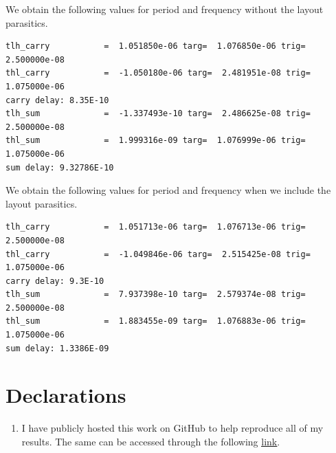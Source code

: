 \documentclass[12pt,a4paper]{article}
\begin{document}
\noindent We obtain the following values for period and frequency without the layout parasitics.
\begin{verbatim}
tlh_carry           =  1.051850e-06 targ=  1.076850e-06 trig=  2.500000e-08
thl_carry           =  -1.050180e-06 targ=  2.481951e-08 trig=  1.075000e-06
carry delay: 8.35E-10
tlh_sum             =  -1.337493e-10 targ=  2.486625e-08 trig=  2.500000e-08
thl_sum             =  1.999316e-09 targ=  1.076999e-06 trig=  1.075000e-06
sum delay: 9.32786E-10
\end{verbatim}
\noindent We obtain the following values for period and frequency when we include the layout parasitics.
\begin{verbatim}
tlh_carry           =  1.051713e-06 targ=  1.076713e-06 trig=  2.500000e-08
thl_carry           =  -1.049846e-06 targ=  2.515425e-08 trig=  1.075000e-06
carry delay: 9.3E-10
tlh_sum             =  7.937398e-10 targ=  2.579374e-08 trig=  2.500000e-08
thl_sum             =  1.883455e-09 targ=  1.076883e-06 trig=  1.075000e-06
sum delay: 1.3386E-09
\end{verbatim}

\section{Declarations}
\begin{enumerate}
    \item I have publicly hosted this work on GitHub to help reproduce all of my results. The same can be accessed through the following \href{https://github.com/iamkarthikbk/ee5311-2025}{\underline{link}}.
\end{enumerate}
\end{document}
